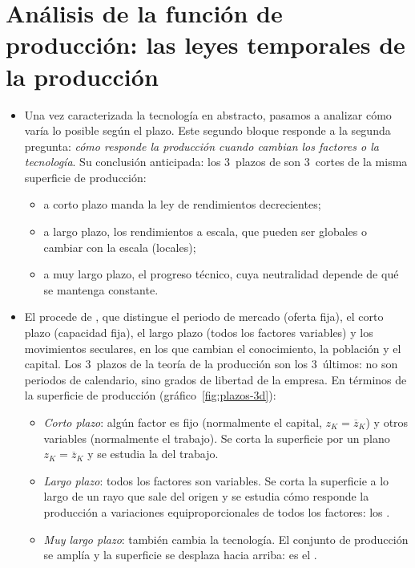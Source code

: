 \documentclass[11pt]{article}
\begin{document}
\section{Análisis de la función de producción:\cortetitulo{} las leyes temporales de la producción}\label{sec:analisis-funcion-produccion}

\begin{itemize}
\item Una vez caracterizada la tecnología en abstracto, pasamos a analizar cómo varía lo posible según el plazo. Este segundo bloque responde a la segunda pregunta: \emph{cómo responde la producción cuando cambian los factores o la tecnología}. Su conclusión anticipada: los 3~plazos de  son 3~cortes de la misma superficie de producción:
  \begin{itemize}
  \item a corto plazo manda la ley de rendimientos decrecientes;
  \item a largo plazo, los rendimientos a escala, que pueden ser globales o cambiar con la escala (locales);
  \item a muy largo plazo, el progreso técnico, cuya neutralidad depende de qué se mantenga constante.
  \end{itemize}
\item El  procede de \textcite[libro~V, cap.~V]{Marshall1890Principles}, que distingue el periodo de mercado (oferta fija), el corto plazo (capacidad fija), el largo plazo (todos los factores variables) y los movimientos seculares, en los que cambian el conocimiento, la población y el capital. Los 3~plazos de la teoría de la producción son los 3~últimos: no son periodos de calendario, sino grados de libertad de la empresa. En términos de la superficie de producción (gráfico~\ref{fig:plazos-3d}):
  \begin{itemize}
  \item \emph{Corto plazo}: algún factor es fijo (normalmente el capital, $z_K=\overline{z}_K$) y otros variables (normalmente el trabajo). Se corta la superficie por un plano $z_K=\overline{z}_K$ y se estudia la  del trabajo.
  \item \emph{Largo plazo}: todos los factores son variables. Se corta la superficie a lo largo de un rayo que sale del origen y se estudia cómo responde la producción a variaciones equiproporcionales de todos los factores: los .
  \item \emph{Muy largo plazo}: también cambia la tecnología. El conjunto de producción se amplía y la superficie se desplaza hacia arriba: es el .
  \end{itemize}
\end{itemize}
\end{document}
